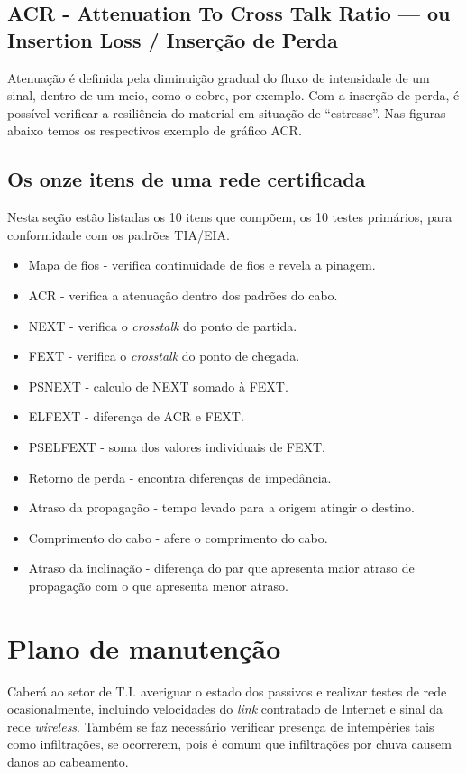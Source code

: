 \documentclass[	DIV=calc,%
							paper=a4,%
							fontsize=12pt,%
							onecolumn]{scrartcl}	 					%
\begin{document}
\subsection{ACR - Attenuation To Cross Talk Ratio --- ou Insertion Loss / Inserção de Perda}
Atenuação é definida pela diminuição gradual do fluxo de intensidade de um sinal, dentro de um meio, como o cobre, por exemplo. Com a inserção de perda, é possível verificar a resiliência do material em situação de ``estresse''. Nas figuras abaixo temos os respectivos exemplo de gráfico ACR.

\subsection{Os onze itens de uma rede certificada}
Nesta seção estão listadas os 10 itens que compõem, os 10 testes primários, para conformidade com os padrões TIA/EIA.

\begin{itemize}
\item Mapa de fios - verifica continuidade de fios e revela a pinagem. 
\item ACR - verifica a atenuação dentro dos padrões do cabo.
\item NEXT - verifica o \textit{crosstalk} do ponto de partida.
\item FEXT - verifica o \textit{crosstalk} do ponto de chegada.
\item PSNEXT - calculo de NEXT somado à FEXT.
\item ELFEXT - diferença de ACR e FEXT.
\item PSELFEXT - soma dos valores individuais de FEXT.
\item Retorno de perda - encontra diferenças de impedância.
\item Atraso da propagação - tempo levado para a origem atingir o destino.
\item Comprimento do cabo - afere o comprimento do cabo.
\item Atraso da inclinação - diferença do par que apresenta maior atraso de propagação com o que apresenta menor atraso.
\end{itemize}


\section{Plano de manutenção}

Caberá ao setor de T.I. averiguar o estado dos passivos e realizar testes de rede ocasionalmente, incluindo velocidades do \textit{link} contratado de Internet e sinal da rede \textit{wireless}. Também se faz necessário verificar presença de intempéries tais como infiltrações, se ocorrerem, pois é comum que infiltrações por chuva causem danos ao cabeamento. 
\\
\end{document}
